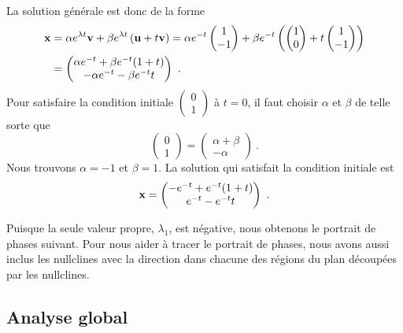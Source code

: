 {La solution générale est donc de la forme
\begin{align*}
\mathbf{x} &= \alpha e^{\lambda t}\mathbf{v} 
+ \beta e^{\lambda t} \left(\mathbf{u} + t \mathbf{v}\right)
=  \alpha e^{-t} \begin{pmatrix} 1 \\ -1 \end{pmatrix}
+ \beta e^{-t}\left( \begin{pmatrix} 1 \\ 0 \end{pmatrix}
+t \begin{pmatrix} 1 \\ -1 \end{pmatrix} \right) \\
&= \begin{pmatrix}
\alpha e^{-t} + \beta e^{-t}(1+t) \\
- \alpha e^{-t} - \beta e^{-t}t
\end{pmatrix} \ .
\end{align*}
Pour satisfaire la condition initiale
$\displaystyle \begin{pmatrix} 0 \\ 1 \end{pmatrix}$ à $t=0$, il faut
choisir $\alpha$ et $\beta$ de telle sorte que
\[
\begin{pmatrix} 0 \\ 1 \end{pmatrix} = \begin{pmatrix}
\alpha + \beta \\ -\alpha \end{pmatrix} \ .
\]
Nous trouvons $\alpha = -1$ et $\beta = 1$.  La solution qui
satisfait la condition initiale est
\[
\mathbf{x} = \begin{pmatrix}
-e^{-t} + e^{-t}(1+t) \\
e^{-t} - e^{-t}t
\end{pmatrix}  \ .
\]

Puisque la seule valeur propre, $\lambda_1$, est négative, nous obtenons
le portrait de phases suivant.
Pour nous aider à tracer le portrait de phases, nous avons aussi
inclus les nullclines avec la direction dans chacune des régions
du plan découpées par les nullclines.
}

\subsection{Analyse global}

